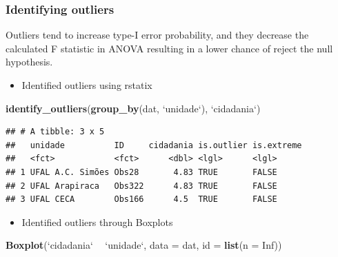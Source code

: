 \documentclass[]{article}
\newenvironment{Shaded}{\begin{snugshade}}{\end{snugshade}}
\newcommand{\DataTypeTok}[1]{\textcolor[rgb]{0.13,0.29,0.53}{#1}}
\newcommand{\KeywordTok}[1]{\textcolor[rgb]{0.13,0.29,0.53}{\textbf{#1}}}
\newcommand{\NormalTok}[1]{#1}
\newcommand{\OperatorTok}[1]{\textcolor[rgb]{0.81,0.36,0.00}{\textbf{#1}}}
\newcommand{\OtherTok}[1]{\textcolor[rgb]{0.56,0.35,0.01}{#1}}
\newcommand{\StringTok}[1]{\textcolor[rgb]{0.31,0.60,0.02}{#1}}
\providecommand{\tightlist}{%
  \setlength{\itemsep}{0pt}\setlength{\parskip}{0pt}}
\begin{document}
\hypertarget{identifying-outliers}{%
\subsubsection{Identifying outliers}\label{identifying-outliers}}

Outliers tend to increase type-I error probability, and they decrease
the calculated F statistic in ANOVA resulting in a lower chance of
reject the null hypothesis.

\begin{itemize}
\tightlist
\item
  Identified outliers using rstatix
\end{itemize}

\begin{Shaded}
\begin{Highlighting}[]
\KeywordTok{identify_outliers}\NormalTok{(}\KeywordTok{group_by}\NormalTok{(dat, }\StringTok{`}\DataTypeTok{unidade}\StringTok{`}\NormalTok{), }\StringTok{`}\DataTypeTok{cidadania}\StringTok{`}\NormalTok{)}
\end{Highlighting}
\end{Shaded}

\begin{verbatim}
## # A tibble: 3 x 5
##   unidade          ID     cidadania is.outlier is.extreme
##   <fct>            <fct>      <dbl> <lgl>      <lgl>     
## 1 UFAL A.C. Simões Obs28       4.83 TRUE       FALSE     
## 2 UFAL Arapiraca   Obs322      4.83 TRUE       FALSE     
## 3 UFAL CECA        Obs166      4.5  TRUE       FALSE
\end{verbatim}

\begin{itemize}
\tightlist
\item
  Identified outliers through Boxplots
\end{itemize}

\begin{Shaded}
\begin{Highlighting}[]
\KeywordTok{Boxplot}\NormalTok{(}\StringTok{`}\DataTypeTok{cidadania}\StringTok{`} \OperatorTok{~}\StringTok{ `}\DataTypeTok{unidade}\StringTok{`}\NormalTok{, }\DataTypeTok{data =}\NormalTok{ dat, }\DataTypeTok{id =} \KeywordTok{list}\NormalTok{(}\DataTypeTok{n =} \OtherTok{Inf}\NormalTok{))}
\end{Highlighting}
\end{Shaded}
\end{document}
